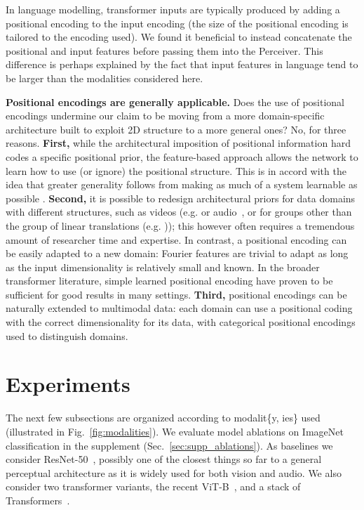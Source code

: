 \documentclass{article}
\begin{document}
In language modelling, transformer inputs are typically produced by adding a positional encoding to the input encoding (the size of the positional encoding is tailored to the encoding used). We found it beneficial to instead concatenate the positional and input features before passing them into the Perceiver. This difference is perhaps explained by the fact that input features in language tend to be larger than the modalities considered here.

\noindent \textbf{Positional encodings are generally applicable.} Does the use of positional encodings undermine our claim to be moving from a more domain-specific architecture built to exploit 2D structure to a more general ones? No, for three reasons. \textbf{First,} while the architectural imposition of positional information hard codes a specific positional prior, the feature-based approach allows the network to learn how to use (or ignore) the positional structure. This is in accord with the idea that greater generality follows from making as much of a system learnable as possible \cite{sutton2019bitter}. \textbf{Second,} it is possible to redesign architectural priors for data domains with different structures, such as videos (e.g. \citealt{tran2015learning} or audio~\cite{ford2019deep}, or for groups other than the group of linear translations (e.g. \citealt{cohen2016group, bronstein2017geometric, esteves2018learning})); this however often requires a tremendous amount of researcher time and expertise. In contrast, a positional encoding can be easily adapted to a new domain: Fourier features are trivial to adapt as long as the input dimensionality is relatively small and known. In the broader transformer literature, simple learned positional encoding have proven to be sufficient for good results in many settings. \textbf{Third,} positional encodings can be naturally extended to multimodal data: each domain can use a positional coding with the correct dimensionality for its data, with categorical positional encodings used to distinguish domains.

\section{Experiments}

The next few subsections are organized according to modalit\{y, ies\} used (illustrated in Fig.~\ref{fig:modalities}). We evaluate model ablations on ImageNet classification in the supplement (Sec.~\ref{sec:supp_ablations}). As baselines we consider ResNet-50~\cite{he2016deep}, possibly one of the closest things so far to a general perceptual architecture as it is widely used for both vision and audio. We also consider two transformer variants, the recent ViT-B~\cite{dosovitskiy2020image}, and a stack of Transformers~\cite{vaswani2017attention}.
\end{document}
